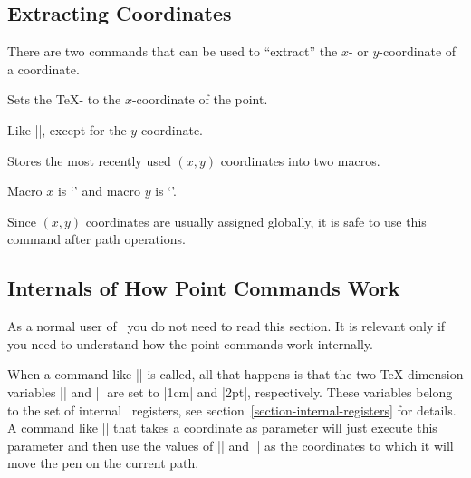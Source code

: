 \subsection{Extracting Coordinates}

There are two commands that can be used to ``extract'' the $x$- or
$y$-coordinate of a coordinate.

\begin{command}{\pgfextractx{}}
    Sets the \TeX- to the $x$-coordinate of the point.
\begin{codeexample}
\newdimen\mydim
\pgfextractx{\mydim}{\pgfpoint{2cm}{4pt}}
\end{codeexample}
\end{command}

\begin{command}{\pgfextracty{}}
    Like |\pgfextractx|, except for the $y$-coordinate.
\end{command}

\begin{command}{\pgfgetlastxy{}}
    Stores the most recently used $(x,y)$ coordinates into two macros.
\begin{codeexample}[]
\pgfpoint{2cm}{4cm}
\pgfgetlastxy{\macrox}{\macroy}
Macro $x$ is `\macrox' and macro $y$ is `\macroy'.
\end{codeexample}
    Since $(x,y)$ coordinates are usually assigned globally, it is safe to use
    this command after path operations.
\end{command}


\subsection{Internals of How Point Commands Work}
\label{section-internal-pointcmds}

As a normal user of \pgfname\ you do not need to read this section. It is
relevant only if you need to understand how the point commands work internally.

When a command like |\pgfpoint{1cm}{2pt}| is called, all that happens is that
the two \TeX-dimension variables |\pgf@x| and |\pgf@y| are set to |1cm| and
|2pt|, respectively. These variables belong to the set of internal \pgfname\
registers, see section~\ref{section-internal-registers} for details. A command
like |\pgfpathmoveto| that takes a coordinate as parameter will just execute
this parameter and then use the values of |\pgf@x| and |\pgf@y| as the
coordinates to which it will move the pen on the current path.

